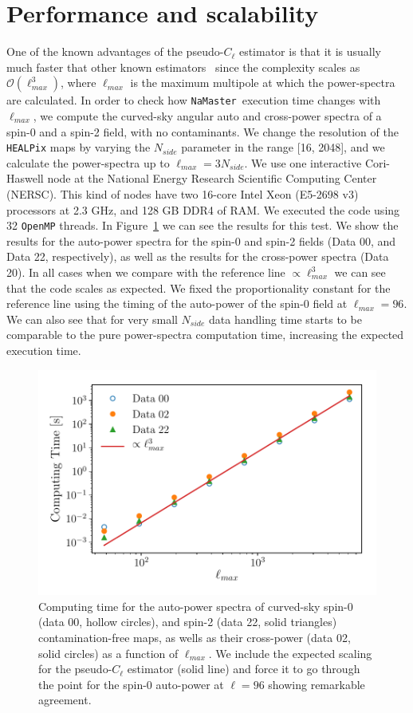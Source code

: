 \documentclass[usenatbib]{mnrasb}
\newcommand{\nmt}{{\tt NaMaster}}
\begin{document}
\section{Performance and scalability}
\label{sec:scalability}
     One of the known advantages of the pseudo-$C_{\ell}$ estimator is that it is usually much faster that other known estimators~\citep{2017MNRAS.465.1847E} since the complexity scales as $\mathcal{O}(\ell_{max}^{3})$, where $\ell_{max}$ is the maximum multipole at which the power-spectra are calculated. In order to check how \nmt\, execution time changes with $\ell_{max}$, we compute the curved-sky angular auto and cross-power spectra of a spin-0 and a spin-2 field, with no contaminants. We change the resolution of the \texttt{HEALPix} maps by varying the $N_{side}$ parameter in the range [16, 2048], and we calculate the power-spectra up to $\ell_{max}=3N_{side}$. We use one interactive Cori-Haswell node at the National Energy Research Scientific Computing Center (NERSC). This kind of nodes have two 16-core Intel Xeon (E5-2698 v3) processors at 2.3 GHz, and 128 GB DDR4 of RAM. We executed the code using 32 \texttt{OpenMP} threads. In Figure~\ref{fig:scaling_lmax} we can see the results for this test. We show the results for the auto-power spectra for the spin-0 and spin-2 fields (Data 00, and Data 22, respectively), as well as the results for the cross-power spectra (Data 20). In all cases when we compare with the reference line $\propto \ell_{max}^{3}$ we can see that the code scales as expected. We fixed the proportionality constant for the reference line using the timing of the auto-power of the spin-0 field at $\ell_{max}=96$.  We can also see that for very small $N_{side}$ data handling time starts to be comparable to the pure power-spectra computation time, increasing the expected execution time.
     
     \begin{figure}
     \centering
     \includegraphics[width=0.9\columnwidth]{time_scaling}
     \caption{Computing time for the auto-power spectra of curved-sky spin-0 (data 00, hollow circles), and spin-2 (data 22, solid triangles) contamination-free maps, as wells as their cross-power (data 02, solid circles) as a function of $\ell_{max}$. We include the expected scaling for the pseudo-$C_{\ell}$ estimator (solid line) and force it to go through the point for the spin-0 auto-power at $\ell=96$ showing remarkable agreement.}
     \label{fig:scaling_lmax}
     \end{figure}
\end{document}
